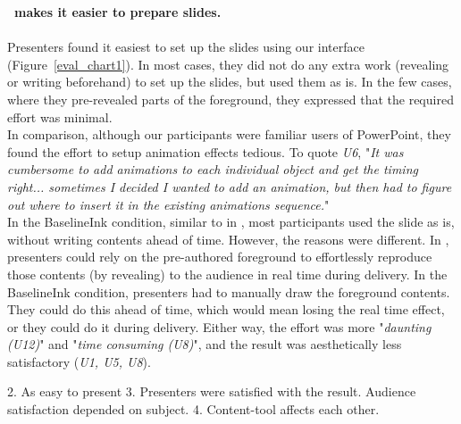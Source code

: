\textbf{\interface\ makes it easier to prepare slides.}\\
\\
Presenters found it easiest to set up the slides using our interface (Figure~\ref{eval_chart1}). In most cases, they did not do any extra work (revealing or writing beforehand) to set up the slides, but used them as is. In the few cases, where they pre-revealed parts of the foreground, they expressed that the required effort was minimal. \\
In comparison, although our participants were familiar users of PowerPoint, they found the effort to setup animation effects tedious. To quote \textit{U6}, "\textit{It was cumbersome to add animations to each individual object and get the timing right... sometimes I decided I wanted to add an animation, but then had to figure out where to insert it in the existing animations sequence.}"\\
In the BaselineInk condition, similar to in \interface, most participants used the slide as is, without writing contents ahead of time. However, the reasons were different. In \interface, presenters could rely on the pre-authored foreground to effortlessly reproduce those contents (by revealing) to the audience in real time during delivery. In the BaselineInk condition, presenters had to manually draw the foreground contents. They could do this ahead of time, which would mean losing the real time effect, or they could do it during delivery. Either way, the effort was more "\textit{daunting (U12)}" and  "\textit{time consuming (U8)}", and the result was aesthetically less satisfactory (\textit{U1, U5, U8}).  

\textbf{}
2. As easy to present
3. Presenters were satisfied with the result. Audience satisfaction depended on subject. 
4. Content-tool affects each other.
